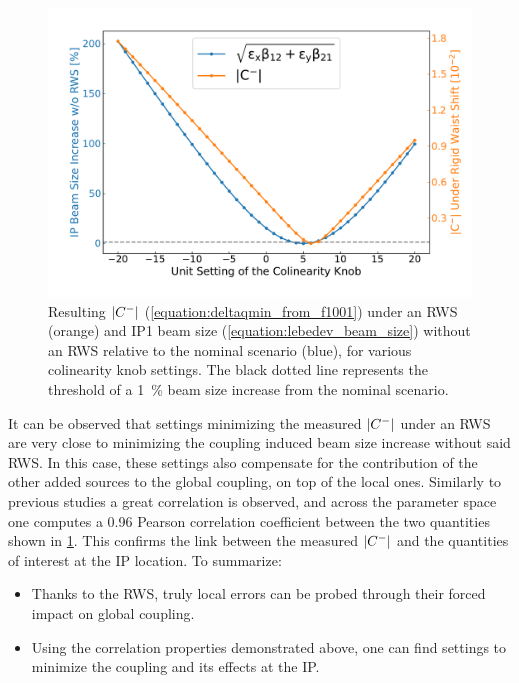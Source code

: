 \begin{figure}[!htb]
    \centering
    \includegraphics*[width=\textwidth]{Figures/IR_Coupling_Correction/full_scenario_cminus_and_ip_size.pdf}
    \caption{Resulting \(\left\lvert C^{-} \right\rvert\) (\cref{equation:deltaqmin_from_f1001}) under an RWS (\textcolor{mplorange}{orange}) and IP\num{1} beam size (\cref{equation:lebedev_beam_size}) without an RWS relative to the nominal scenario (\textcolor{mplblue}{blue}), for various colinearity knob settings. The black dotted line represents the threshold of a \qty{1}{\percent} beam size increase from the nominal scenario.}
    \label{figure:full_scenario_colin_correction_dqmin_lebedev}
\end{figure}

It can be observed that settings minimizing the measured \(\left\lvert C^{-} \right\rvert\) under an RWS are very close to minimizing the coupling induced beam size increase without said RWS.
In this case, these settings also compensate for the contribution of the other added sources to the global coupling, on top of the local ones.
Similarly to previous studies a great correlation is observed, and across the parameter space one computes a \num{0.96} Pearson correlation coefficient between the two quantities shown in \cref{figure:full_scenario_colin_correction_dqmin_lebedev}.
This confirms the link between the measured \(\left\lvert C^{-} \right\rvert\) and the quantities of interest at the IP location.
To summarize:
\begin{itemize}
    \item Thanks to the RWS, truly local errors can be probed through their forced impact on global coupling.
    \item Using the correlation properties demonstrated above, one can find settings to minimize the coupling and its effects at the IP.
\end{itemize}

